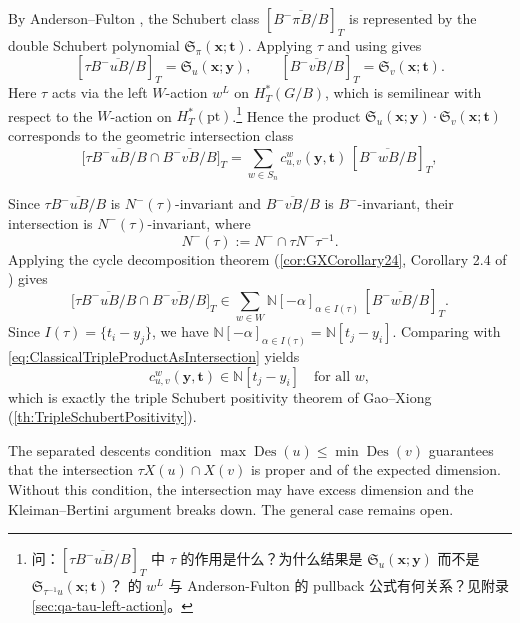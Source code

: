By Anderson--Fulton \cite[Theorem 10.6.4]{AndersonFulton}, the Schubert class $[\overline{B^-\pi B/B}]_T$ is represented by the double Schubert polynomial $\mathfrak{S}_\pi(\mathbf{x};\mathbf{t})$. Applying $\tau$ and using \cite[Section 16.5]{AndersonFulton} gives
$$[\tau\overline{B^-uB/B}]_T = \mathfrak{S}_u(\mathbf{x};\mathbf{y}),\qquad [\overline{B^-vB/B}]_T = \mathfrak{S}_v(\mathbf{x};\mathbf{t}).$$
Here $\tau$ acts via the left $W$-action $w^L$ on $H_T^*(G/B)$, which is semilinear with respect to the $W$-action on $H_T^*(\mathrm{pt})$.\footnote{问：$[\tau\overline{B^-uB/B}]_T$ 中 $\tau$ 的作用是什么？为什么结果是 $\mathfrak{S}_u(\mathbf{x};\mathbf{y})$ 而不是 $\mathfrak{S}_{\tau^{-1}u}(\mathbf{x};\mathbf{t})$？\cite{GX2025} 的 $w^L$ 与 Anderson-Fulton 的 pullback 公式有何关系？见附录 \cref{sec:qa-tau-left-action}。}
Hence the product $\mathfrak{S}_u(\mathbf{x};\mathbf{y}) \cdot \mathfrak{S}_v(\mathbf{x};\mathbf{t})$ corresponds to the geometric intersection class
$$\bigl[\tau\overline{B^-uB/B} \cap \overline{B^-vB/B}\bigr]_T = \sum_{w \in S_n} c_{u,v}^w(\mathbf{y},\mathbf{t})\,[\overline{B^-wB/B}]_T,
\label{eq:ClassicalTripleProductAsIntersection}$$

Since $\tau\overline{B^-uB/B}$ is $N^-(\tau)$-invariant and $\overline{B^-vB/B}$ is $B^-$-invariant, their intersection is $N^-(\tau)$-invariant, where
$$N^-(\tau) := N^- \cap \tau N^- \tau^{-1}.$$
Applying the cycle decomposition theorem (\cref{cor:GXCorollary24}, Corollary 2.4 of \cite{GX2025}) gives
$$\bigl[\tau\overline{B^-uB/B} \cap \overline{B^-vB/B}\bigr]_T \in \sum_{w \in W} \mathbb{N}[-\alpha]_{\alpha \in I(\tau)}\,[\overline{B^-wB/B}]_T.$$
Since $I(\tau) = \{t_i - y_j\}$, we have $\mathbb{N}[-\alpha]_{\alpha \in I(\tau)} = \mathbb{N}[t_j - y_i]$. Comparing with \cref{eq:ClassicalTripleProductAsIntersection} yields
$$c_{u,v}^w(\mathbf{y},\mathbf{t}) \in \mathbb{N}[t_j - y_i]\quad\text{for all }w,$$
which is exactly the triple Schubert positivity theorem of Gao--Xiong (\cref{th:TripleSchubertPositivity}).

\begin{Remark}\label{rmk:SeparatedDescentsRole}
The separated descents condition $\max\operatorname{Des}(u) \leq \min\operatorname{Des}(v)$ guarantees that the intersection $\tau X(u) \cap X(v)$ is proper and of the expected dimension. Without this condition, the intersection may have excess dimension and the Kleiman--Bertini argument breaks down. The general case remains open.
\end{Remark}

